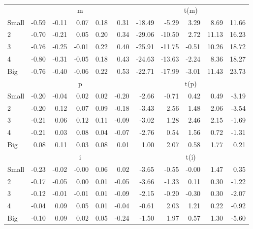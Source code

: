 \begin{table}[!ht]
\begin{tabular}{lrrrrrrrrrr}
      & \multicolumn{5}{c}{m} & \multicolumn{5}{c}{t(m)}
    
    \\
      \cmidrule(r){2-6} \cmidrule(r){7-11}

    Small   & -0.59  & -0.11  & 0.07  & 0.18  & 0.31  & -18.49  & -5.29  & 3.29  & 8.69  & 11.66  \\
         2  & -0.70  & -0.21  & 0.05  & 0.20  & 0.34  & -29.06  & -10.50  & 2.72  & 11.13  & 16.23  \\
         3  & -0.76  & -0.25  & -0.01  & 0.22  & 0.40  & -25.91  & -11.75  & -0.51  & 10.26  & 18.72  \\
         4  & -0.80  & -0.31  & -0.05  & 0.18  & 0.43  & -24.63  & -13.63  & -2.24  & 8.36  & 18.27  \\
    Big     & -0.76  & -0.40  & -0.06  & 0.22  & 0.53  & -22.71  & -17.99  & -3.01  & 11.43  & 23.73  \\

  
    
      & \multicolumn{5}{c}{p} & \multicolumn{5}{c}{t(p)}
    
    \\
      \cmidrule(r){2-6} \cmidrule(r){7-11}

    Small   & -0.20  & -0.04  & 0.02  & 0.02  & -0.20  & -2.66  & -0.71  & 0.42  & 0.49  & -3.19  \\
         2  & -0.20  & 0.12  & 0.07  & 0.09  & -0.18  & -3.43  & 2.56  & 1.48  & 2.06  & -3.54  \\
         3  & -0.21  & 0.06  & 0.12  & 0.11  & -0.09  & -3.02  & 1.28  & 2.46  & 2.15  & -1.69  \\
         4  & -0.21  & 0.03  & 0.08  & 0.04  & -0.07  & -2.76  & 0.54  & 1.56  & 0.72  & -1.31  \\
    Big     & 0.08  & 0.11  & 0.03  & 0.08  & 0.01  & 1.00  & 2.07  & 0.58  & 1.77  & 0.21  \\

  
    
      & \multicolumn{5}{c}{i} & \multicolumn{5}{c}{t(i)}
    
    \\
      \cmidrule(r){2-6} \cmidrule(r){7-11}

    Small   & -0.23  & -0.02  & -0.00  & 0.06  & 0.02  & -3.65  & -0.55  & -0.00  & 1.47  & 0.35  \\
         2  & -0.17  & -0.05  & 0.00  & 0.01  & -0.05  & -3.66  & -1.33  & 0.11  & 0.30  & -1.22  \\
         3  & -0.12  & -0.01  & -0.01  & 0.01  & -0.09  & -2.15  & -0.20  & -0.30  & 0.30  & -2.07  \\
         4  & -0.04  & 0.09  & 0.05  & 0.01  & -0.04  & -0.61  & 2.03  & 1.21  & 0.22  & -0.92  \\
    Big     & -0.10  & 0.09  & 0.02  & 0.05  & -0.24  & -1.50  & 1.97  & 0.57  & 1.30  & -5.60  \\

  

  \bottomrule
\end{tabular}
\label{tbl:25_Size_Prior_B16b}
\end{table}